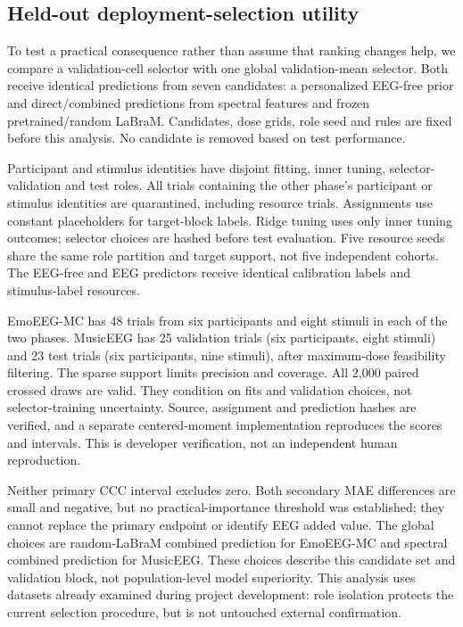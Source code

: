 \subsection{Held-out deployment-selection utility}
\label{app:selection-utility}

To test a practical consequence rather than assume that ranking changes help,
we compare a validation-cell selector with one global validation-mean selector.
Both receive identical predictions from seven candidates: a personalized
EEG-free prior and direct/combined predictions from spectral features and frozen
pretrained/random LaBraM. Candidates, dose grids, role seed and rules are fixed
before this analysis. No candidate is removed based on test performance.

Participant and stimulus identities have disjoint fitting, inner tuning,
selector-validation and test roles. All trials containing the other phase's
participant or stimulus identities are quarantined, including resource trials.
Assignments use constant placeholders for target-block labels. Ridge tuning
uses only inner tuning outcomes; selector choices are hashed before test
evaluation. Five resource seeds share the same role partition and target
support, not five independent cohorts. The EEG-free and EEG predictors receive
identical calibration labels and stimulus-label resources.

EmoEEG-MC has 48 trials from six participants and eight stimuli in each of the
two phases. MusicEEG has 25 validation trials (six participants, eight stimuli)
and 23 test trials (six participants, nine stimuli), after maximum-dose
feasibility filtering. The sparse support limits precision and coverage. All
2,000 paired crossed draws are valid. They condition on fits and validation
choices, not selector-training uncertainty. Source, assignment and prediction
hashes are verified, and a separate centered-moment implementation reproduces
the scores and intervals. This is developer verification, not an independent
human reproduction.



Neither primary CCC interval excludes zero. Both secondary MAE differences
are small and negative, but no practical-importance threshold was established;
they cannot replace the primary endpoint or identify EEG added value. The
global choices are random-LaBraM combined prediction for EmoEEG-MC and spectral
combined prediction for MusicEEG. These choices describe this candidate set and
validation block, not population-level model superiority. This analysis uses
datasets already examined during project development: role isolation protects
the current selection procedure, but is not untouched external confirmation.

